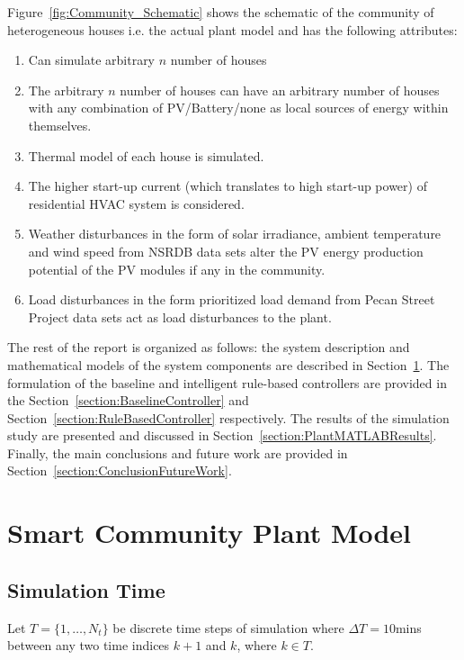 \documentclass[11pt,usenames]{article}
\begin{document}
Figure~\ref{fig:Community_Schematic} shows the schematic of the community of heterogeneous houses i.e. the actual plant model and has the following attributes:

\begin{enumerate}
	\item Can simulate arbitrary $n$ number of houses
	\item The arbitrary $n$ number of houses can have an arbitrary number of houses with any combination of PV/Battery/none as local sources of energy within themselves.
	\item Thermal model of each house is simulated.
	\item The higher start-up current (which translates to high start-up power) of residential HVAC system is considered.
	\item Weather disturbances in the form of solar irradiance, ambient temperature and wind speed from NSRDB data sets alter the PV energy production potential of the PV modules if any in the community.
	\item Load disturbances in the form prioritized load demand from Pecan Street Project data sets act as load disturbances to the plant.
\end{enumerate}

The rest of the report is organized as follows: the system description and mathematical models of the system components are described in Section~\ref{section:PlantModel}. The formulation of the baseline and intelligent rule-based controllers are provided in the  Section~\ref{section:BaselineController} and Section~\ref{section:RuleBasedController} respectively. The results of the simulation study are presented and discussed in Section~\ref{section:PlantMATLABResults}. Finally, the main conclusions and future work are provided in Section~\ref{section:ConclusionFutureWork}.
\newpage

\section{Smart Community Plant Model}\label{section:PlantModel}

\subsection{Simulation Time}\label{subsection:SimulationTime}
Let $T=\{1,\dots,N_{t}\}$ be discrete time steps of simulation where $\Delta T = 10$mins between any two time indices $k+1$ and $k$, where $k \in T$.
\end{document}
